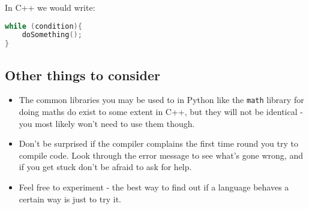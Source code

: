 In C++ we would write:

\begin{lstlisting}[language={C++}]
while (condition){
    doSomething();
}
\end{lstlisting}

\subsection{Other things to consider}\label{other-things-to-consider}

\begin{itemize}
\tightlist
\item
  The common libraries you may be used to in Python like the
  \lstinline!math! library for doing maths do exist to some extent in
  C++, but they will not be identical - you most likely won't need to
  use them though.
\item
  Don't be surprised if the compiler complains the first time round you
  try to compile code. Look through the error message to see what's gone
  wrong, and if you get stuck don't be afraid to ask for help.
\item
  Feel free to experiment - the best way to find out if a language
  behaves a certain way is just to try it.
\end{itemize}
